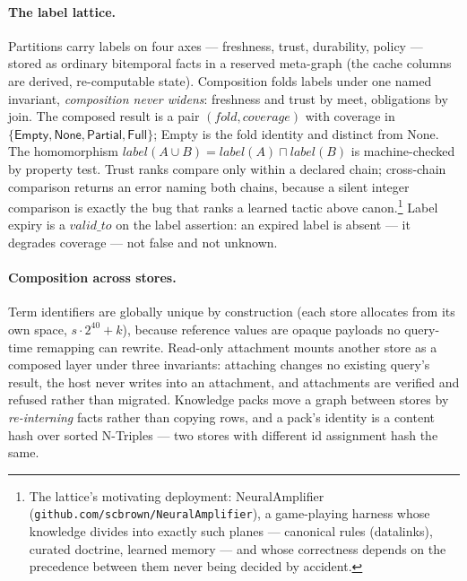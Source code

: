 \paragraph{The label lattice.}
Partitions carry labels on four axes --- freshness, trust, durability,
policy --- stored as ordinary bitemporal facts in a reserved meta-graph
(the cache columns are derived, re-computable state). Composition
folds labels under one named invariant, \emph{composition never
widens}: freshness and trust by meet, obligations by join. The
composed result is a pair $(\mathit{fold}, \mathit{coverage})$ with
coverage in $\{\textsf{Empty}, \textsf{None}, \textsf{Partial},
\textsf{Full}\}$; \textsf{Empty} is the fold identity and distinct
from \textsf{None}. The homomorphism
$\mathit{label}(A \cup B) = \mathit{label}(A) \sqcap \mathit{label}(B)$
is machine-checked by property test. Trust ranks compare only within a
declared chain; cross-chain comparison returns an error naming both
chains, because a silent integer comparison is exactly the bug that
ranks a learned tactic above canon.\footnote{The lattice's motivating
deployment: NeuralAmplifier
(\texttt{github.com/scbrown/NeuralAmplifier}), a game-playing harness
whose knowledge divides into exactly such planes --- canonical rules
(datalinks), curated doctrine, learned memory --- and whose correctness depends
on the precedence between them never being decided by accident.} Label expiry is a
$\mathit{valid\_to}$ on the label assertion: an expired label is
absent --- it degrades coverage --- not false and not unknown.

\paragraph{Composition across stores.}
Term identifiers are globally unique by construction (each store
allocates from its own space, $s \cdot 2^{40} + k$), because reference
values are opaque payloads no query-time remapping can rewrite.
Read-only attachment mounts another store as a composed layer under
three invariants: attaching changes no existing query's result, the
host never writes into an attachment, and attachments are verified and
refused rather than migrated. Knowledge packs move a graph between
stores by \emph{re-interning} facts rather than copying rows, and a
pack's identity is a content hash over sorted N-Triples --- two stores
with different id assignment hash the same.
